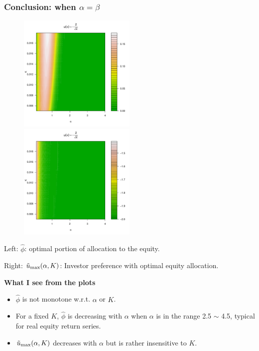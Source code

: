 \documentclass{beamer}
\begin{document}
\begin{frame}
  \frametitle{Conclusion: when $\alpha = \beta$}
  \begin{minipage}[t]{0.6\linewidth}
    \begin{figure}[htb!]
        \includegraphics[width=0.5\textwidth]{phi_hat_pareto5e-1.pdf}    
        \includegraphics[width=0.5\textwidth]{preference_pareto5e-1.pdf}
    \end{figure}
    \begin{scriptsize}
    Left: $\hat \phi$: optimal portion of allocation to the equity.

    Right: $\tilde u_{\rm max}(\alpha, K)$: Investor preference  with
    optimal equity allocation.
    \end{scriptsize}
  \end{minipage}\hfill
  \begin{minipage}[t]{0.4\linewidth}
    \begin{scriptsize}
      \textcolor[HTML]{990033}{\bf What I see from the plots}
    \begin{itemize}
    \item $\hat \phi$ is not monotone w.r.t. $\alpha$ or $K$.
    \item For a fixed $K$, $\hat \phi$ is decreasing with $\alpha$
      when $\alpha$ is in the range 2.5 $\sim$ 4.5, typical for real
      equity return series.
      \item $\tilde u_{\rm max}(\alpha, K)$ decreases with $\alpha$ 
        but is rather insensitive to $K$.
    \end{itemize}
    \end{scriptsize}
    \end{minipage}
\end{frame}
\end{document}
